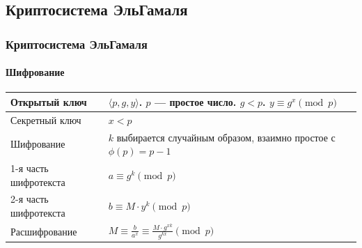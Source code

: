 \subsection{Криптосистема ЭльГамаля}


\begin{frame}
    \frametitle{Криптосистема ЭльГамаля}
    \framesubtitle{Шифрование}

    \begin{table}[ht]
        \centering
        \begin{tabular}[c]{p{}|p{}}
            \hline\hline
            Открытый ключ & $\langle p,g,y\rangle$. $p$ --- простое число. $g<p$. $y\equiv g^x\pmod{p}$ \\ \hline
            Секретный ключ & $x<p$\\ \hline
            Шифрование & $k$ выбирается случайным образом, взаимно простое с $\phi(p)=p-1$\\ 
            1-я часть шифротекста & $a\equiv g^k\pmod{p}$\\
            2-я часть шифротекста & $b\equiv M\cdot y^k\pmod{p}$\\ \hline
            Расшифрование & $M \equiv \frac{b}{a^x} \equiv \frac{M\cdot g^{xk}}{g^{kx}}\pmod{p}$\\
            \hline\hline
        \end{tabular}
    \end{table}
\end{frame}


